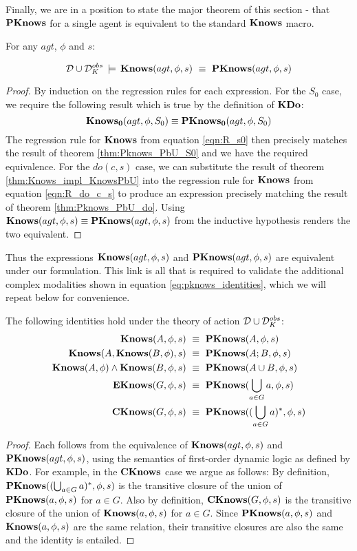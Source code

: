 Finally, we are in a position to state the major theorem of this section
- that $\mathbf{PKnows}$ for a single agent is equivalent to the standard
$\mathbf{Knows}$ macro.

\begin{thm}
For any $agt$, $\phi$ and $s$:

\[
\mathcal{D}\cup\mathcal{D}_{K}^{obs}\,\models\,\mathbf{Knows}(agt,\phi,s)\,\,\equiv\,\,\mathbf{PKnows}(agt,\phi,s)\]

\end{thm}
\begin{proof}
By induction on the regression rules for each expression. For the
$S_{0}$ case, we require the following result which is true by the
definition of $\mathbf{KDo}$:\[
\mathbf{Knows_{0}}(agt,\phi,S_{0})\equiv\mathbf{PKnows_{0}}(agt,\phi,S_{0})\]
The regression rule for $\mathbf{Knows}$ from equation \eqref{eqn:R_s0}
then precisely matches the result of theorem \ref{thm:Pknows_PbU_S0}
and we have the required equivalence. For the $do(c,s)$ case, we
can substitute the result of theorem \ref{thm:Knows_impl_KnowsPbU}
into the regression rule for $\mathbf{Knows}$ from equation \eqref{eqn:R_do_c_s}
to produce an expression precisely matching the result of theorem
\ref{thm:Pknows_PbU_do}. Using $\mathbf{Knows}(agt,\phi,s)\equiv\mathbf{PKnows}(agt,\phi,s)$
from the inductive hypothesis renders the two equivalent.
\end{proof}
\medskip{}


Thus the expressions $\mathbf{Knows}(agt,\phi,s)$ and $\mathbf{PKnows}(agt,\phi,s)$
are equivalent under our formulation. This link is all that is required
to validate the additional complex modalities shown in equation \eqref{eq:pknows_identities},
which we will repeat below for convenience.

\begin{thm}
The following identities hold under the theory of action $\mathcal{D}\cup\mathcal{D}_{K}^{obs}$:\begin{align*}
\mathbf{Knows}(A,\phi,s) & \,\,\equiv\,\,\mathbf{PKnows}(A,\phi,s)\\
\mathbf{Knows}(A,\mathbf{Knows}(B,\phi),s) & \,\,\equiv\,\,\mathbf{PKnows}(A;B,\phi,s)\\
\mathbf{Knows}(A,\phi)\wedge\mathbf{Knows}(B,\phi,s) & \,\,\equiv\,\,\mathbf{PKnows}(A\cup B,\phi,s)\\
\mathbf{EKnows}(G,\phi,s) & \,\,\equiv\,\,\mathbf{PKnows}(\bigcup_{a\in G}a,\phi,s)\\
\mathbf{CKnows}(G,\phi,s) & \,\,\equiv\,\,\mathbf{PKnows}((\bigcup_{a\in G}a)^{*},\phi,s)\end{align*}

\end{thm}
\begin{proof}
Each follows from the equivalence of $\mathbf{Knows}(agt,\phi,s)$ and $\mathbf{PKnows}(agt,\phi,s)$,
using the semantics of first-order dynamic logic as defined by $\mathbf{KDo}$.
For example, in the $\mathbf{CKnows}$ case we argue as follows: By definition,
$\mathbf{PKnows}((\bigcup_{a\in G}a)^{*},\phi,s)$ is the transitive closure
of the union of $\mathbf{PKnows}(a,\phi,s)$ for $a\in G$. Also by definition,
$\mathbf{CKnows}(G,\phi,s)$ is the transitive closure of the union of $\mathbf{Knows}(a,\phi,s)$
for $a\in G$. Since $\mathbf{PKnows}(a,\phi,s)$ and $\mathbf{Knows}(a,\phi,s)$
are the same relation, their transitive closures are also the same
and the identity is entailed.
\end{proof}

